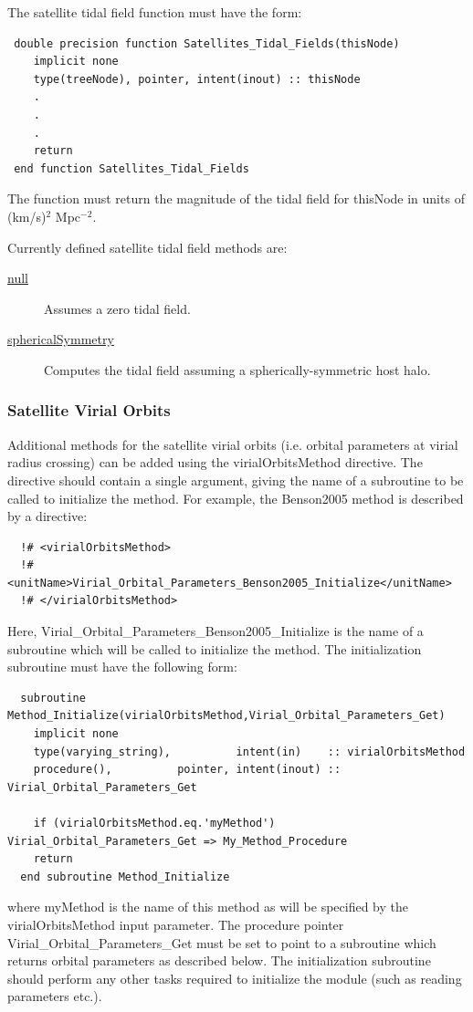 The satellite tidal field function must have the form:
\begin{verbatim}
 double precision function Satellites_Tidal_Fields(thisNode)
    implicit none
    type(treeNode), pointer, intent(inout) :: thisNode
    .
    .
    .
    return
 end function Satellites_Tidal_Fields
\end{verbatim}
The function must return the magnitude of the tidal field for {\normalfont \ttfamily thisNode} in units of (km/s)$^2$ Mpc$^{-2}$.

Currently defined satellite tidal field methods are:
\begin{description}
 \item [\hyperlink{satellites.tidal_fields.null.F90:satellites_tidal_fields_null}{{\normalfont \ttfamily null}}] Assumes a zero tidal field.
 \item [\hyperlink{satellites.tidal_fields.spherical_symmetry.F90:satellites_tidal_fields_spherical_symmetry}{{\normalfont \ttfamily sphericalSymmetry}}] Computes the tidal field assuming a spherically-symmetric host halo.
\end{description}

\subsubsection{Satellite Virial Orbits}\label{sec:SatelliteVirialOrbits}

Additional methods for the satellite virial orbits (i.e. orbital parameters at virial radius crossing) can be added using the {\normalfont \ttfamily virialOrbitsMethod} directive. The directive should contain a single argument, giving the name of a subroutine to be called to initialize the method. For example, the {\normalfont \ttfamily Benson2005} method is described by a directive:
\begin{verbatim}
  !# <virialOrbitsMethod>
  !#  <unitName>Virial_Orbital_Parameters_Benson2005_Initialize</unitName>
  !# </virialOrbitsMethod>
\end{verbatim}
Here, {\normalfont \ttfamily Virial\_Orbital\_Parameters\_Benson2005\_Initialize} is the name of a subroutine which will be called to initialize the method. The initialization subroutine must have the following form:
\begin{verbatim}
  subroutine Method_Initialize(virialOrbitsMethod,Virial_Orbital_Parameters_Get)
    implicit none
    type(varying_string),          intent(in)    :: virialOrbitsMethod
    procedure(),          pointer, intent(inout) :: Virial_Orbital_Parameters_Get
    
    if (virialOrbitsMethod.eq.'myMethod') Virial_Orbital_Parameters_Get => My_Method_Procedure
    return
  end subroutine Method_Initialize
\end{verbatim}
where {\normalfont \ttfamily myMethod} is the name of this method as will be specified by the {\normalfont \ttfamily virialOrbitsMethod} input parameter. The procedure pointer {\normalfont \ttfamily Virial\_Orbital\_Parameters\_Get} must be set to point to a subroutine which returns orbital parameters as described below. The initialization subroutine should perform any other tasks required to initialize the module (such as reading parameters etc.).

